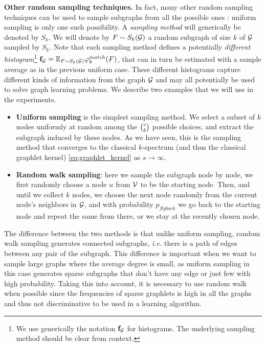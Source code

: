 \noindent\textbf{Other random sampling techniques.} In fact, many other random sampling techniques can be used to sample subgraphs from all the possible ones \citep{graph_sampling}: uniform sampling is only one such possibility. A \emph{sampling method} will generically be denoted by $S_k$. We will denote by $F \sim S_k(\mathcal{G})$ a random subgraph of size $k$ of $\mathcal{G}$ sampled by $S_k$. Note that each sampling method defines a potentially \emph{different histogram}\footnote{We use generically the notation $\mathbf{f}_{\mathcal{G}}$ for histograms. The underlying sampling method should be clear from context.} $\mathbf{f}_{\mathcal{G}} = \mathbb{E}_{F \sim S_k(\mathcal{G})} \varphi^{match}_k(F)$, that can in turn be estimated with a sample average as in the previous uniform case. These different histograms capture different kinds of information from the graph $\mathcal{G}$ and may all potentially be used to solve graph learning problems. We describe two examples that we will use in the experiments.
\begin{itemize}
	\item \textbf{Uniform sampling} is the simplest sampling method. We select a subset of $k$ nodes uniformly at random among the $\tbinom{v}{k}$ possible choices, and extract the subgraph induced by these nodes. As we have seen, this is the sampling method that converges to the classical $k$-spectrum (and thus the classical graphlet kernel) \eqref{eq:graphlet_kernel} as $s \to \infty$.
	\item \textbf{Random walk sampling}: here we sample the subgraph node by node, we first randomly choose a node $u$ from $\mathcal{V}$ to be the starting node. Then, and until we collect $k$ nodes, we choose the next node randomly from the current node's neighbors in $\mathcal{G}$, and with probability $p_{flyback}$ we go back to the starting node and repeat the same from there, or we stay at the recently chosen node.
\end{itemize}
The difference between the two methods is that unlike uniform sampling, random walk sampling generates  connected subgraphs, \emph{i.e.} there is a path of edges between any pair of the subgraph. This difference is important when we want to sample large graphs where the average degree is small, as uniform sampling in this case generates sparse subgraphs that don't have any edge or just few with high probability. Taking this into account, it is necessary to use random walk when possible since the frequencies of sparse graphlets is high in all the graphs and thus not discriminative to be used in a learning algorithm. 

